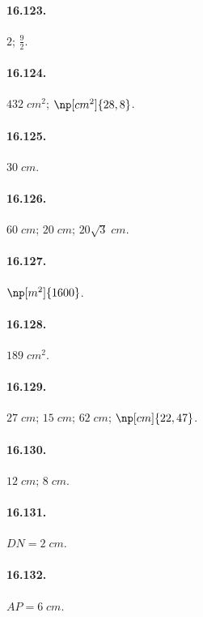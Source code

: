 \begin{multicols}{2}
\paragraph{16.123.}
$2$; $\frac{9}{2}$.

\paragraph{16.124.}
$432\;\unit{cm^2}$; $\np[cm^2]{28,8}$.

\paragraph{16.125.}
$30\;\unit{cm}$.

\paragraph{16.126.}
$60\;\unit{cm}$; $20\;\unit{cm}$; $20\sqrt{3}\;\unit{cm}$.

\paragraph{16.127.}
$\np[m^2]{1600}$.

\paragraph{16.128.}
$189\;\unit{cm^2}$.

\paragraph{16.129.}
$27\;\unit{cm}$; $15\;\unit{cm}$; $62\;\unit{cm}$; $\np[cm]{22,47}$.

\paragraph{16.130.}
$12\;\unit{cm}$; $8\;\unit{cm}$.

\paragraph{16.131.}
$DN=2\;\unit{cm}$.

\paragraph{16.132.}
$AP=6\;\unit{cm}$.

\end{multicols}
